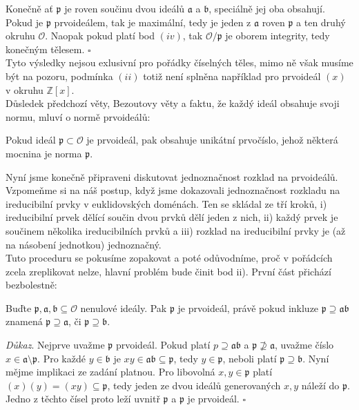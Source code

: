 \documentclass [12pt]{report}
\begin{document}
Konečně ať $\mathfrak{p}$ je roven součinu dvou ideálů $\mathfrak{a}$ a $\mathfrak{b}$, speciálně jej oba obsahují. Pokud je $\mathfrak{p}$ prvoideálem, tak je maximální, tedy je jeden z $\mathfrak{a}$ roven $\mathfrak{p}$ a ten druhý okruhu $\mathcal{O}$. Naopak pokud platí bod $(iv)$, tak $\mathcal{O}/\mathfrak{p}$ je oborem integrity, tedy konečným tělesem. \hfill $\square$\\


Tyto výsledky nejsou exlusivní pro pořádky číselných těles, mimo ně však musíme být na pozoru, podmínka $(ii)$ totiž není splněna například pro prvoideál $(x)$ v okruhu $\mathbb{Z}[x]$.\\

Důsledek předchozí věty, Bezoutovy věty a faktu, že každý ideál obsahuje svoji normu, mluví o normě prvoideálů:
\begin{dusledek}
Pokud ideál $\mathfrak{p} \subset \mathcal{O}$ je prvoideál, pak obsahuje unikátní prvočíslo, jehož některá mocnina je norma $\mathfrak{p}$.
\end{dusledek}

Nyní jsme konečně připraveni diskutovat jednoznačnost rozklad na prvoideálů.\\

Vzpomeňme si na náš postup, když jsme dokazovali jednoznačnost rozkladu na ireducibilní prvky v euklidovských doménách. Ten se skládal ze tří kroků, i)  ireducibilní prvek dělící součin dvou prvků dělí jeden z nich, ii) každý prvek je součinem několika ireducibilních prvků a iii) rozklad na ireducibilní prvky je (až na násobení jednotkou) jednoznačný.\\

Tuto proceduru se pokusíme zopakovat a poté odůvodníme, proč v pořádcích zcela zreplikovat nelze, hlavní problém bude činit bod ii). První část přichází bezbolestně:

\begin{veta}\label{prvobsah}
Buďte $\mathfrak{p},\mathfrak{a},\mathfrak{b} \subseteq \mathcal{O}$ nenulové ideály. Pak $\mathfrak{p}$ je prvoideál, právě pokud inkluze $\mathfrak{p} \supseteq \mathfrak{a} \mathfrak{b}$ znamená $\mathfrak{p} \supseteq \mathfrak{a}$, či $\mathfrak{p} \supseteq \mathfrak{b}$.
\end{veta}

\noindent \textit{Důkaz}. Nejprve uvažme $\mathfrak{p}$ prvoideál. Pokud platí $p \supseteq \mathfrak{a} \mathfrak{b}$ a $\mathfrak{p} \not\supseteq \mathfrak{a}$, uvažme číslo $x \in \mathfrak{a} \setminus \mathfrak{p}$. Pro každé $y \in \mathfrak{b}$ je $xy \in \mathfrak{ab} \subseteq \mathfrak{p}$, tedy $y \in \mathfrak{p}$, neboli platí $\mathfrak{p} \supseteq \mathfrak{b}$. Nyní mějme implikaci ze zadání platnou. Pro libovolná $x,y \in \mathfrak{p}$ platí $ (x)(y) = (xy) \subseteq \mathfrak{p}$, tedy jeden ze dvou ideálů generovaných $x,y$ náleží do $\mathfrak{p}$. Jedno z těchto čísel proto leží uvnitř $\mathfrak{p}$ a $\mathfrak{p}$ je prvoideál. \hfill $\square$\\
\end{document}
